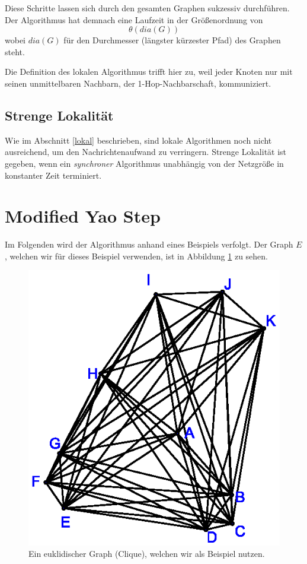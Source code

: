 \documentclass[a4paper,twoside]{IEEEtran}
\begin{document}
Diese Schritte lassen sich durch den gesamten Graphen sukzessiv durchführen. 
Der Algorithmus hat demnach eine Laufzeit in der Größenordnung von 
\begin{equation*}
\theta (dia(G)) 
\end{equation*}
wobei $dia(G) $ für den Durchmesser (längster kürzester Pfad) des Graphen steht.

Die Definition des lokalen Algorithmus trifft hier zu, weil jeder Knoten nur mit seinen unmittelbaren Nachbarn, der 1-Hop-Nachbarschaft, kommuniziert.






\subsection{Strenge Lokalität}
Wie im Abschnitt \ref{lokal} beschrieben, sind lokale Algorithmen noch nicht ausreichend, um den Nachrichtenaufwand zu verringern.
Strenge Lokalität ist gegeben, wenn ein \emph{synchroner} Algorithmus unabhängig von der Netzgröße in konstanter Zeit terminiert.



\section{Modified Yao Step}
Im Folgenden wird der Algorithmus anhand eines Beispiels verfolgt.
Der Graph $E $, welchen wir für dieses Beispiel verwenden, ist in Abbildung \ref{fig:beispielgraph} zu sehen.

\begin{figure}[h!]
\centering
\includegraphics[width=0.6\linewidth]{beispielgraph.eps}
\caption{Ein euklidischer Graph (Clique), welchen wir als Beispiel nutzen.}
\label{fig:beispielgraph}
\end{figure}
\end{document}
